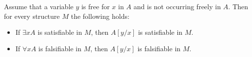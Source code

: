 

\setcounter{section}{2}
\setcounter{subsection}{1}
\setcounter{dfn}{3}

\begin{lem}
\label{lem:VarSubstitute}
Assume that a variable $y$ is free for $x$ in $A$ and is not occurring freely in $A$.
Then for every structure $M$ the following holds:
\begin{itemize}
\item
If $\exists x A$ is satisfiable in $M$, then $A[y/x]$ is satisfiable in $M$.
\item
If $\forall x A$ is falsifiable in $M$, then $A[y/x]$ is falsifiable in $M$.
\end{itemize}
\end{lem}

